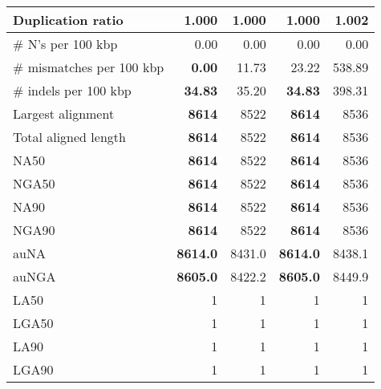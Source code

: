 \documentclass[12pt,a4paper]{article}
\begin{document}
\begin{table}[ht]
\begin{center}
\begin{tabular}{|l*{4}{|r}|}
Duplication ratio & {\bf 1.000} & {\bf 1.000} & {\bf 1.000} & 1.002 \\ \hline
\# N's per 100 kbp & 0.00 & 0.00 & 0.00 & 0.00 \\ \hline
\# mismatches per 100 kbp & {\bf 0.00} & 11.73 & 23.22 & 538.89 \\ \hline
\# indels per 100 kbp & {\bf 34.83} & 35.20 & {\bf 34.83} & 398.31 \\ \hline
Largest alignment & {\bf 8614} & 8522 & {\bf 8614} & 8536 \\ \hline
Total aligned length & {\bf 8614} & 8522 & {\bf 8614} & 8536 \\ \hline
NA50 & {\bf 8614} & 8522 & {\bf 8614} & 8536 \\ \hline
NGA50 & {\bf 8614} & 8522 & {\bf 8614} & 8536 \\ \hline
NA90 & {\bf 8614} & 8522 & {\bf 8614} & 8536 \\ \hline
NGA90 & {\bf 8614} & 8522 & {\bf 8614} & 8536 \\ \hline
auNA & {\bf 8614.0} & 8431.0 & {\bf 8614.0} & 8438.1 \\ \hline
auNGA & {\bf 8605.0} & 8422.2 & {\bf 8605.0} & 8449.9 \\ \hline
LA50 & 1 & 1 & 1 & 1 \\ \hline
LGA50 & 1 & 1 & 1 & 1 \\ \hline
LA90 & 1 & 1 & 1 & 1 \\ \hline
LGA90 & 1 & 1 & 1 & 1 \\ \hline
\end{tabular}
\end{center}
\end{table}
\end{document}
